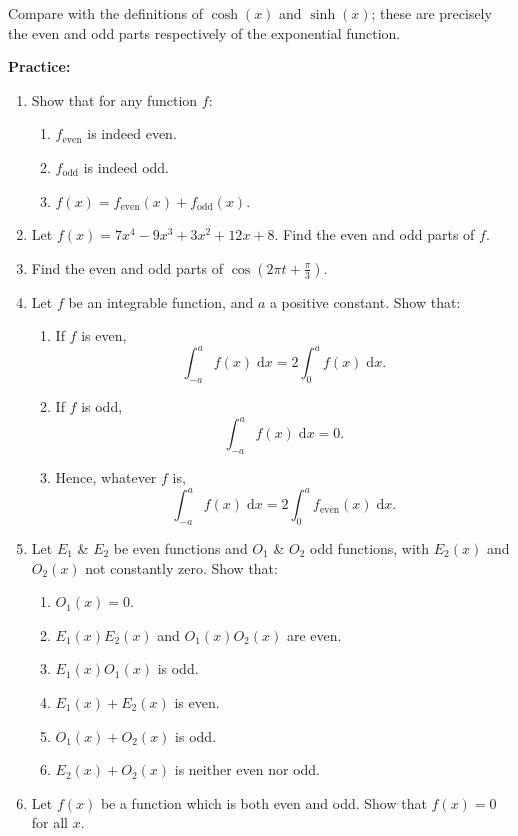 \documentclass{article}
\newcommand{\diff}{\;\mathrm{d}}
\begin{document}
Compare with the definitions of $\cosh(x)$ and $\sinh(x)$; these are precisely the even and odd parts respectively of the exponential function.



\clearpage






	
	
	






\textbf{Practice:}\bigskip



\begin{enumerate}
	\item Show that for any function $f$:
		\begin{enumerate}
			\item $f_\mathrm{even}$ is indeed even.
			\item $f_\mathrm{odd}$ is indeed odd.
			\item $f(x)=f_\mathrm{even}(x)+f_\mathrm{odd}(x)$.
		\end{enumerate}
	\item Let $f(x)=7x^4-9x^3+3x^2+12x+8$. Find the even and odd parts of $f$.
	\item Find the even and odd parts of $\cos\left(2\pi t + \frac{\pi}{3}\right)$.
	\item Let $f$ be an integrable function, and $a$ a positive constant. Show that:
		\begin{enumerate}
			\item If $f$ is even,
				\[\int_{-a}^a f(x)\diff x=2\int_0^a f(x)\diff x.\]
			\item If $f$ is odd,
				\[\int_{-a}^a f(x)\diff x=0.\]
			\item Hence, whatever $f$ is,
				\[\int_{-a}^a f(x)\diff x = 2\int_0^a f_\mathrm{even}(x)\diff x.\]
		\end{enumerate}
	\item Let $E_1$ \& $E_2$ be even functions and $O_1$ \& $O_2$ odd functions, with $E_2(x)$ and $O_2(x)$ not constantly zero. Show that:
		\begin{enumerate}
			\item $O_1(x)=0$.
			\item $E_1(x)E_2(x)$ and $O_1(x)O_2(x)$ are even.
			\item $E_1(x)O_1(x)$ is odd.
			\item $E_1(x)+E_2(x)$ is even.
			\item $O_1(x)+O_2(x)$ is odd.
			\item $E_2(x)+O_2(x)$ is neither even nor odd.
		\end{enumerate}
	\item Let $f(x)$ be a function which is both even and odd. Show that $f(x)=0$ for all $x$.
\end{enumerate}
\end{document}
